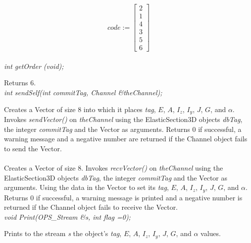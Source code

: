 \begin{equation}
code := \left[
   \begin{array}{c}
       2 \\
       1 \\
       4 \\
       3 \\
       5 \\
       6
   \end{array} 
 \right]
\end{equation} \\

{\em int getOrder (void); } 

Returns 6. \\

{\em    int sendSelf(int commitTag, Channel \&theChannel); }

Creates a Vector of size $8$ into which it places  {\em tag},
$E$, $A$, $I_z$, $I_y$, $J$, $G$, and $\alpha$. Invokes {\em sendVector()} on 
{\em theChannel} using the ElasticSection3D objects {\em dbTag}, the integer
{\em commitTag} and the Vector as arguments. Returns $0$ if successful, a warning
message and a negative number are returned if the Channel object fails to send
the Vector. \\

\\
Creates a Vector of size $8$. Invokes {\em recvVector()} on  {\em
theChannel} using the ElasticSection3D objects {\em dbTag}, the integer
{\em commitTag} and the Vector as arguments. Using the data in the
Vector to set its {\em tag}, $E$, $A$, $I_z$, $I_y$, $J$, $G$, and $\alpha$.
Returns $0$ if successful, a warning message is printed and a negative number
is returned if the Channel object fails to receive the Vector. \\

{\em    void Print(OPS_Stream \&s, int flag =0);} 

Prints to the stream {\em s} the object's {\em tag}, $E$, $A$, $I_z$, $I_y$, $J$, 
$G$, and $\alpha$ values. \\



